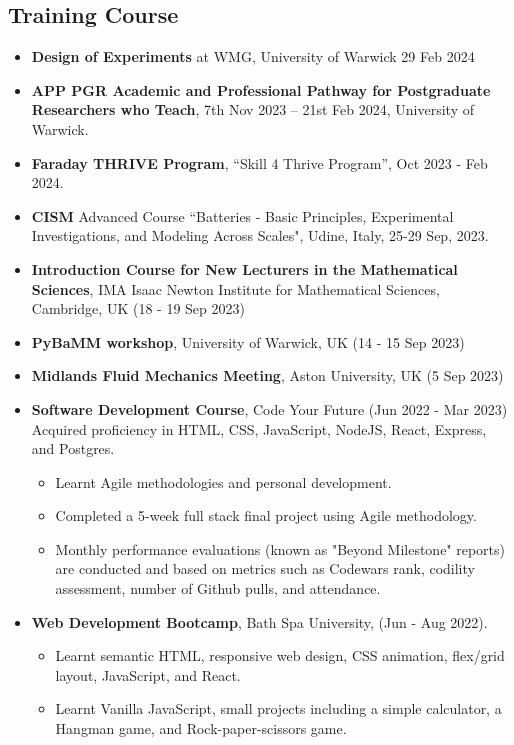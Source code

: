 \documentclass[line]{res}
\newenvironment{p1}
{\begin{adjustwidth}{-30pt}{0pt}
\vspace{8pt}}
{\end{adjustwidth}}
\begin{document}
\begin{resume}
\section{Training Course}
\begin{p1}
\begin{itemize}
	\item \textbf{Design of Experiments} at WMG, University of Warwick 29 Feb 2024
	\item \textbf{APP PGR Academic and Professional Pathway for Postgraduate Researchers who Teach}, 7th Nov 2023 – 21st Feb 2024, University of Warwick.
	\item \textbf{Faraday THRIVE Program}, “Skill 4 Thrive Program”, Oct 2023 - Feb 2024.
	\item \textbf{CISM} Advanced Course “Batteries - Basic Principles, Experimental Investigations, and Modeling Across Scales", Udine, Italy, 25-29 Sep, 2023.
	\item \textbf{Introduction Course for New Lecturers in the Mathematical Sciences}, IMA Isaac Newton Institute for Mathematical Sciences, Cambridge, UK (18 - 19 Sep 2023)
	\item \textbf{PyBaMM workshop}, University of Warwick, UK (14 - 15 Sep 2023)
	\item \textbf{Midlands Fluid Mechanics Meeting}, Aston University, UK (5 Sep  2023)
	\item \textbf{Software Development Course}, Code Your Future (Jun 2022 - Mar 2023)
	Acquired proficiency in HTML, CSS, JavaScript, NodeJS, React, Express, and Postgres.
	\begin{itemize}
		\item Learnt Agile methodologies and personal development.
		\item Completed a 5-week full stack final project using Agile methodology.
		\item Monthly performance evaluations (known as "Beyond Milestone" reports) are conducted and based on metrics such as Codewars rank, codility assessment, number of Github pulls, and attendance.
	\end{itemize}
	
	\item \textbf{Web Development Bootcamp}, Bath Spa University, (Jun - Aug 2022).
	\begin{itemize}
		\item 	Learnt semantic HTML, responsive web design, CSS animation, flex/grid layout, JavaScript, and React.
		\item Learnt Vanilla JavaScript, small projects including a simple calculator, a Hangman game, and Rock-paper-scissors game.
	\end{itemize}
	

\end{itemize}
\end{p1}
\end{resume}
\end{document}
